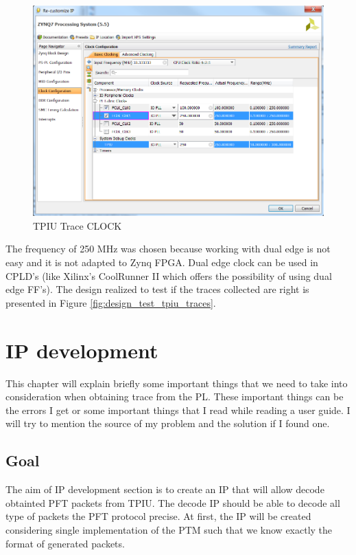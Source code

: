 \documentclass[10pt,a4paper, oneside]{memoir}
\begin{document}
\begin{figure}
\centering
\includegraphics[scale=.6, keepaspectratio]{images/zynq_trace_clk}
\caption{TPIU Trace CLOCK}
\label{fig:tpiu_trace_clk}
\end{figure}



The frequency of 250 MHz was chosen because working with dual edge is not easy and it is not adapted to Zynq FPGA. Dual edge clock can be used in CPLD's (like Xilinx's CoolRunner II which offers the possibility of using dual edge FF's). The design realized to test if the traces collected are right is presented in Figure \ref{fig:design_test_tpiu_traces}.




\chapter{IP development}
This chapter will explain briefly some important things that we need to take into consideration when obtaining trace from the PL. These important things can be the errors I get or some important things that I read while reading a user guide. I will try to mention the source of my problem and the solution if I found one. 

\section{Goal}
The aim of IP development section is to create an IP that will allow decode obtainted PFT packets from TPIU. The decode IP should be able to decode all type of packets the PFT protocol precise. At first, the IP will be created considering single implementation of the PTM such that we know exactly the format of generated packets. 
\end{document}
